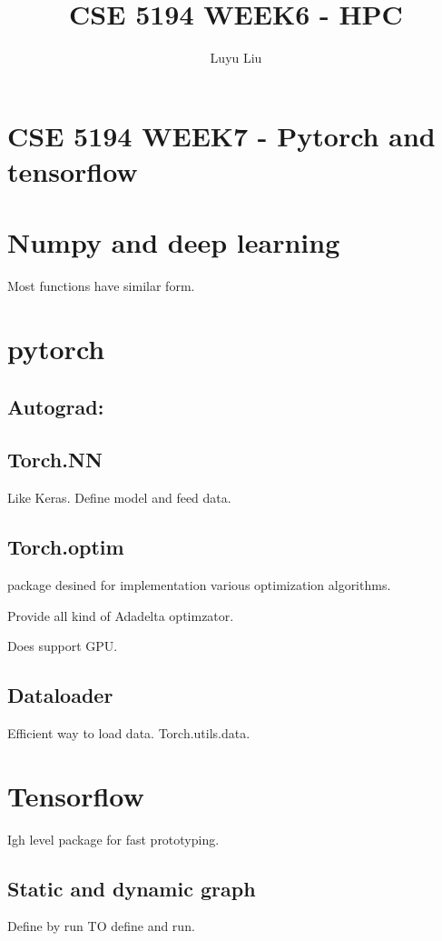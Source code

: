 \documentclass[12pt]{article}
\begin{document}
\author{Luyu Liu}

\newcommand\para{\par\refstepcounter{para}\thepara\space}

\section*{CSE 5194 WEEK7 - Pytorch and tensorflow}
\title{CSE 5194 WEEK6 - HPC}
\section{Numpy and deep learning}

Most functions have similar form.


\section{pytorch}
\subsection{Autograd:}
\subsection{Torch.NN} Like Keras.
Define model and feed data.

\subsection{Torch.optim}
package desined for implementation various optimization algorithms.

Provide all kind of Adadelta optimzator.

Does support GPU.

\subsection{Dataloader}
Efficient way to load data. Torch.utils.data.


\section{Tensorflow}

Igh level package for fast prototyping.

\subsection{Static and dynamic graph}
Define by run TO define and run.
\end{document}
